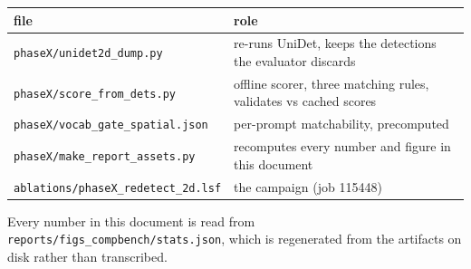 \documentclass[11pt,a4paper]{article}
\newcommand{\code}[1]{\texttt{\small #1}}
\begin{document}
\begin{table}[htbp]\centering\small
\begin{tabular}{ll}
\toprule
file & role \\
\midrule
\code{phaseX/unidet2d\_dump.py}       & re-runs UniDet, keeps the detections the evaluator discards \\
\code{phaseX/score\_from\_dets.py}    & offline scorer, three matching rules, validates vs cached scores \\
\code{phaseX/vocab\_gate\_spatial.json} & per-prompt matchability, precomputed \\
\code{phaseX/make\_report\_assets.py} & recomputes every number and figure in this document \\
\code{ablations/phaseX\_redetect\_2d.lsf} & the campaign (job 115448) \\
\bottomrule
\end{tabular}
\end{table}

Every number in this document is read from \code{reports/figs\_compbench/stats.json}, which is
regenerated from the artifacts on disk rather than transcribed.
\end{document}
